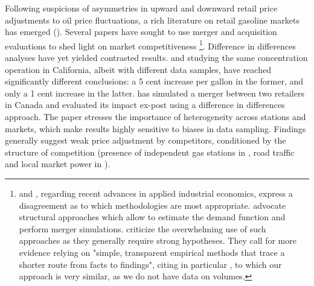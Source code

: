 \documentclass[english]{article}
\begin{document}
Following suspicions of asymmetries in upward and downward retail price adjustments to oil price fluctuations, a rich literature on retail gasoline markets has emerged (\cite{ECK13}). Several papers have sought to use merger and acquisition evaluations to shed light on market competitiveness%
\footnote{\cite{EIN10} and \cite{ANG10}, regarding recent advances in applied industrial economics, express a disagreement as to which methodologies are most appropriate. \cite{EIN10} advocate structural approaches which allow to estimate the demand function and perform merger simulations. \cite{ANG10} criticize the overwhelming use of such approaches as they generally require strong hypotheses. They call for more evidence relying on "simple, transparent empirical methods that trace a shorter route from facts to findings", citing in particular \cite{HAS04}, to which our approach is very similar, as we do not have data on volumes.%
}. Difference in differences analyses have yet yielded contrasted results. \cite{HAS04} and \cite{TAY10} studying the same concentration operation in California, albeit with different data samples, have reached significantly different conclusions: a 5 cent increase per gallon in the former, and only a 1 cent increase in the latter. \cite{HOU12} has simulated a merger between two retailers in Canada and evaluated its impact ex-post using a difference in differences approach. The paper stresses the importance of heterogeneity across stations and markets, which make results highly sensitive to biases in data sampling. Findings generally suggest weak price adjustment by competitors, conditioned by the structure of competition (presence of independent gas stations in \cite{HAS04}, road traffic and local market power in \cite{HOU12}).
\medskip{}
\end{document}
